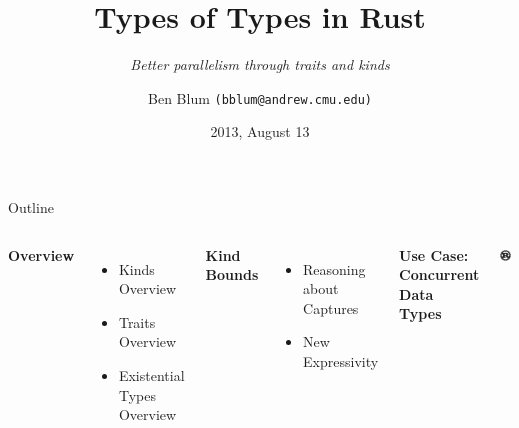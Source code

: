 \documentclass[xcolor=dvipsnames]{beamer}
\title[Kinds for Parallelism]{{\bf Types of Types in Rust}}
\subtitle[]{ {\em Better parallelism through traits and kinds}}
\author[Ben Blum]{Ben Blum \texttt{(bblum@andrew.cmu.edu)}}
\institute[Mozilla Research]{Mozilla Research}
\date[]{2013, August 13}
\begin{document}
\renewcommand{\inserttotalframenumber}{28}
\normalem
\begin{frame}
	\titlepage
\end{frame}


\newcommand\linegap{\vspace{0.2in}}
\newcommand\breakslide[1]{\begin{frame}{} \begin{center} \Large #1 \end{center} \end{frame}}
\newcommand\related[1]{\textsuperscript{\em [#1]}}
\newcommand\hilight[2]{\color{#1}#2\color{black}}

\begin{frame}{Outline}
	\begin{columns}
	\textbf{Overview}
	\begin{itemize}
		\item Kinds Overview
		\item Traits Overview
		\item Existential Types Overview
	\end{itemize}
	\linegap

	{\bf Kind Bounds}
	\begin{itemize}
		\item Reasoning about Captures
		\item New Expressivity
	\end{itemize}
	\linegap

	{\bf Use Case: Concurrent Data Types}
	\linegap

	\begin{center}
	\includegraphics[width=0.9\textwidth]{rust.png}
	\end{center}
	\end{columns}
\end{frame}
\end{document}
